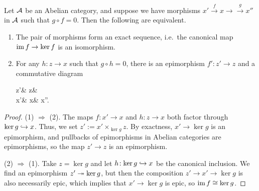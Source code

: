 \begin{lemma}\label{lemma:five-lemma-technical-necessary-lemma}\textup{\cite[Lemma 8.3.12]{kashiwara-schapira-book}}
	Let \(\mathcal{A}\) be an Abelian category, and suppose we have morphisms \(x' \overset{f}\to x \to \overset{g}\to x'' \) in \(\mathcal{A}\) such that \(g\circ f = 0\).
	Then the following are equivalent.
	\begin{enumerate}[label=(\arabic*)]
		\item The pair of morphisms form an exact sequence, i.e.\ the canonical map \(\operatorname{im}{f} \to \ker{f}\) is an isomorphism.
		\item For any \(h\!:z\to x\) such that \(g\circ h = 0\), there is an epimorphism \(f'\!:z'\to z\) and a commutative diagram
		\begin{diagram*}
			z'\ar[d] & z\ar[dr,"0"]\ar[d,"h"] & \\
			x'\ar[r,"f"] & x\ar[r,"g"] & x''.
		\end{diagram*}
	\end{enumerate}
\end{lemma}
\begin{proof}
(1) \(\Rightarrow\) (2). The maps \(f\!:x'\to x\) and \(h\!:z\to x\) both factor through \(\ker{g}\hookrightarrow x\). Thus, we set \(z' := x'\times_{\ker{g}}z\).
By exactness, \(x'\to\ker{g}\) is an epimorphism, and pullbacks of epimorphisms in Abelian categories are epimorphisms, so the map \(z'\to z\) is an epimorphism.

(2) \(\Rightarrow\) (1). Take \(z = \ker{g}\) and let \(h\!:\ker{g}\hookrightarrow x\) be the canonical inclusion. We find an epimorphism \(z'\twoheadrightarrow\ker{g}\),
but then the composition \(z'\to x'\to\ker{g}\) is also necessarily epic, which implies that \(x'\to\ker{g}\) is epic, so \(\operatorname{im}{f}\cong\ker{g}\).
\end{proof}

